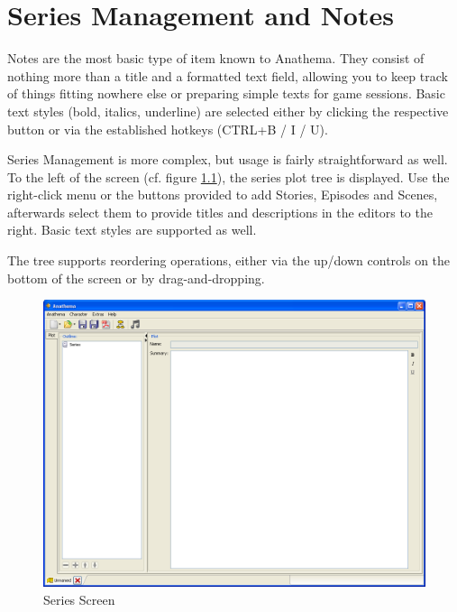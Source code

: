 \chapter{Series Management and Notes}
Notes are the most basic type of item known to Anathema. They consist of nothing more than a title and a formatted text 
field, allowing you to keep track of things fitting nowhere else or preparing simple texts for game sessions.
Basic text styles (bold, italics, underline) are selected either by clicking the respective button or via the established hotkeys (CTRL+B / I / U).

Series Management is more complex, but usage is fairly straightforward as well. To the left of the screen (cf. figure \ref{fig:Series}), the series plot tree is displayed. Use the right-click menu or the buttons provided to add Stories, Episodes and Scenes, afterwards select them to provide titles and descriptions in the editors to the right. Basic text styles are supported as well.

The tree supports reordering operations, either via the up/down controls on the bottom of the screen or by drag-and-dropping.

\begin{figure}
	\centering
		\includegraphics[width=1.00\textwidth]{images/Series.png}
	\caption{Series Screen}
	\label{fig:Series}
\end{figure}
